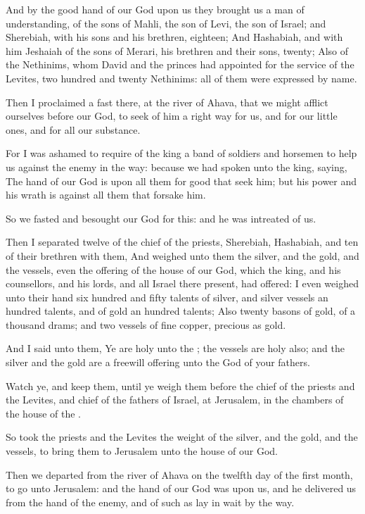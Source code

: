 \Verse And by the good hand of our God upon us they brought us a man of understanding, of the sons of Mahli, the son of Levi, the son of Israel; and Sherebiah, with his sons and his brethren, eighteen; \Verse And Hashabiah, and with him Jeshaiah of the sons of Merari, his brethren and their sons, twenty; \Verse Also of the Nethinims, whom David and the princes had appointed for the service of the Levites, two hundred and twenty Nethinims: all of them were expressed by name.

\Verse Then I proclaimed a fast there, at the river of Ahava, that we might afflict ourselves before our God, to seek of him a right way for us, and for our little ones, and for all our substance.

\Verse For I was ashamed to require of the king a band of soldiers and horsemen to help us against the enemy in the way: because we had spoken unto the king, saying, The hand of our God is upon all them for good that seek him; but his power and his wrath is against all them that forsake him.

\Verse So we fasted and besought our God for this: and he was intreated of us.

\Verse Then I separated twelve of the chief of the priests, Sherebiah, Hashabiah, and ten of their brethren with them, \Verse And weighed unto them the silver, and the gold, and the vessels, even the offering of the house of our God, which the king, and his counsellors, and his lords, and all Israel there present, had offered: \Verse I even weighed unto their hand six hundred and fifty talents of silver, and silver vessels an hundred talents, and of gold an hundred talents; \Verse Also twenty basons of gold, of a thousand drams; and two vessels of fine copper, precious as gold.

\Verse And I said unto them, Ye are holy unto the \LORD; the vessels are holy also; and the silver and the gold are a freewill offering unto the \LORD God of your fathers.

\Verse Watch ye, and keep them, until ye weigh them before the chief of the priests and the Levites, and chief of the fathers of Israel, at Jerusalem, in the chambers of the house of the \LORD.

\Verse So took the priests and the Levites the weight of the silver, and the gold, and the vessels, to bring them to Jerusalem unto the house of our God.

\Verse Then we departed from the river of Ahava on the twelfth day of the first month, to go unto Jerusalem: and the hand of our God was upon us, and he delivered us from the hand of the enemy, and of such as lay in wait by the way.

